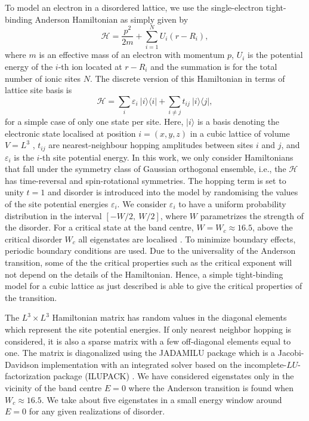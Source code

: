 To model an electron in a disordered lattice, we use the single-electron tight-binding Anderson Hamiltonian as simply given by
%
\begin{equation}
 \mathcal{H}=\frac{p^2}{2m}+\sum_{i=1}^N U_i(r-R_i),
\end{equation}
%
where $m$ is an effective mass of an electron with momentum $p$, $U_i$ is the potential energy of the $i$-th ion located at $r-R_i$ and the summation is for the total number of ionic sites $N$.
The discrete version of this Hamiltonian in terms of lattice site basis is
%
\begin{equation} \label{anderson_H1} 
\mathcal{H}=\sum_{i} \varepsilon_{i}~\vert i\rangle\langle i\vert + \sum_{i\neq j} t_{ij}~\vert i\rangle\langle j\vert,
\end{equation}
%
for a simple case of only one state per site.
%
Here, $|i\rangle$ is a basis denoting the electronic state localised at position $i=(x,y,z)$ in a cubic lattice of volume $V=L^3$
, $t_{ij}$ are nearest-neighbour hopping amplitudes between sites $i$ and $j$, and $\varepsilon_i$ is the $i$-th site potential energy.  
In this work, we only consider Hamiltonians that fall under the symmetry class of Gaussian orthogonal ensemble, i.e., the $\mathcal{H}$ has time-reversal and spin-rotational symmetries.  The hopping term is set to unity $t=1$ and disorder is introduced into the model by randomising the values of the site potential energies $\varepsilon_i$.
We consider $\varepsilon_i$ to have a uniform probability distribution in the interval $[-W/2,~W/2]$, where $W$ parametrizes the strength of the disorder.  For a critical state at the band centre, $W=W_c\approx16.5$, above the critical disorder $W_c$ all eigenstates are localised \cite{SleMO03,SleMO01,OhtSK99,MilRSU00}.  To minimize boundary effects, periodic boundary conditions are used.
Due to the universality of the Anderson transition, some of the the critical properties such as the critical exponent will not depend on the details of the Hamiltonian.  Hence, a simple tight-binding model for a cubic lattice as just described is able to give the critical properties of the transition.

The $L^3\times L^3$ Hamiltonian matrix has random values in the diagonal elements which represent the site potential energies.  If only nearest neighbor hopping is considered, it is also a sparse matrix with a few off-diagonal elements equal to one.  The matrix is diagonalized using the JADAMILU package \cite{BolN07} which is a Jacobi-Davidson implementation with an integrated solver based on the incomplete-$LU$-factorization package (ILUPACK) \cite{SchBR06, BolN07}.
We have considered eigenstates only in the vicinity of the band centre $E=0$ where the Anderson transition is found when $W_c\approx 16.5$.  We take about five eigenstates in a small energy window around $E=0$ for any given realizations of disorder.

